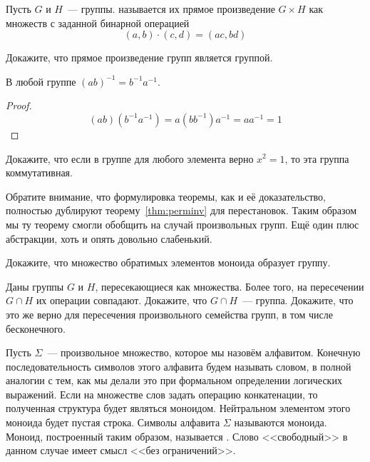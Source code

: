 \begin{definition}
	Пусть $G$ и $H$~--- группы.  называется их прямое произведение $G\times H$ как множеств с заданной бинарной операцией
	\[
	(a, b) \cdot (c, d) = (ac, bd)
	\]
\end{definition}

\begin{exercise}
	Докажите, что прямое произведение групп является группой.
\end{exercise}

\begin{thm}
	В любой группе $(ab)^{-1}=b^{-1}a^{-1}$.
\end{thm}
\begin{proof}
	\[
	(ab)(b^{-1}a^{-1}) = a(bb^{-1})a^{-1} = aa^{-1} = 1
	\]
\end{proof}

\begin{exercise}
	Докажите, что если в группе для любого элемента верно $x^2 = 1$, то эта группа коммутативная.
\end{exercise}

Обратите внимание, что формулировка теоремы, как и её доказательство, полностью дублируют теорему~\ref{thm:perminv} для перестановок. Таким образом мы ту теорему смогли обобщить на случай произвольных групп. Ещё один плюс абстракции, хоть и опять довольно слабенький.

\begin{exercise}
	Докажите, что множество обратимых элементов моноида образует группу.
\end{exercise}

\begin{exercise}\label{ex:grpint}
	Даны группы $G$ и $H$, пересекающиеся как множества. Более того, на пересечении $G\cap H$ их операции совпадают. Докажите, что $G\cap H$~--- группа. Докажите, что это же верно для пересечения произвольного семейства групп, в том числе бесконечного.
\end{exercise}

\begin{example}
	Пусть $\Sigma$~--- произвольное множество, которое мы назовём алфавитом. Конечную последовательность символов этого алфавита будем называть словом, в полной аналогии с тем, как мы делали это при формальном определении логических выражений. Если на множестве слов задать операцию конкатенации, то полученная структура будет являться моноидом. Нейтральном элементом этого моноида будет пустая строка. Символы алфавита $\Sigma$ называются  моноида. Моноид, построенный таким образом, называется . Слово <<свободный>> в данном случае имеет смысл <<без ограничений>>.
\end{example}

